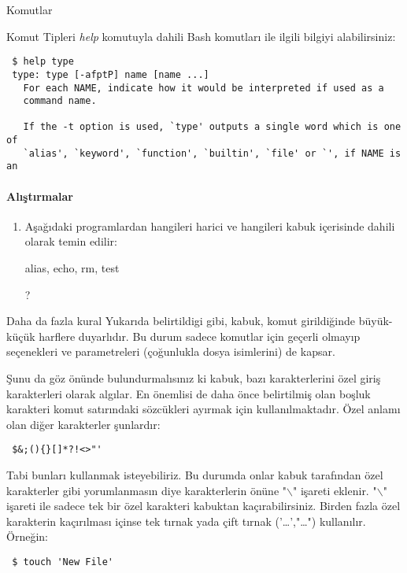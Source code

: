 \begin{section}{Komutlar}
\begin{subsection}{Komut Tipleri}
\emph{help} komutuyla dahili Bash komutları ile ilgili bilgiyi alabilirsiniz:
\footnotesize 
\begin{verbatim}
 $ help type
 type: type [-afptP] name [name ...]
   For each NAME, indicate how it would be interpreted if used as a
   command name.
   
   If the -t option is used, `type' outputs a single word which is one of
   `alias', `keyword', `function', `builtin', `file' or `', if NAME is an
\end{verbatim}
 \normalsize
\paragraph{{\Huge{\PencilLeftDown}}Alıştırmalar}{
\pointedenum\begin{enumerate}
\item Aşağıdaki programlardan hangileri harici ve hangileri kabuk içerisinde dahili olarak temin edilir: \begin{em}alias, echo, rm, test\end{em}?
\end{enumerate}
}
\end{subsection}
\begin{subsection}{Daha da fazla kural}\label{sec:bolum424}
Yukarıda belirtildigi gibi, kabuk, komut girildiğinde büyük-küçük harflere duyarlıdır. Bu durum sadece komutlar için geçerli olmayıp seçenekleri ve parametreleri (çoğunlukla dosya isimlerini) de kapsar.

Şunu da göz önünde bulundurmalısınız ki kabuk, bazı karakterlerini özel giriş karakterleri olarak algılar. En önemlisi de daha önce belirtilmiş olan boşluk karakteri komut satırındaki sözcükleri ayırmak için kullanılmaktadır. Özel anlamı olan diğer karakterler şunlardır:

\footnotesize 
\begin{verbatim}
 $&;(){}[]*?!<>"'
\end{verbatim}
\normalsize

Tabi bunları kullanmak isteyebiliriz. Bu durumda onlar kabuk tarafından özel karakterler gibi yorumlanmasın diye karakterlerin önüne "$\backslash$" işareti eklenir. "$\backslash$" işareti ile sadece tek bir özel karakteri kabuktan kaçırabilirsiniz. Birden fazla özel karakterin kaçırılması içinse tek tırnak yada çift tırnak ('\ldots',"\ldots") kullanılır. Örneğin:

\footnotesize 
\begin{verbatim}
 $ touch 'New File'
\end{verbatim}
\normalsize


\end{subsection}
\end{section}
